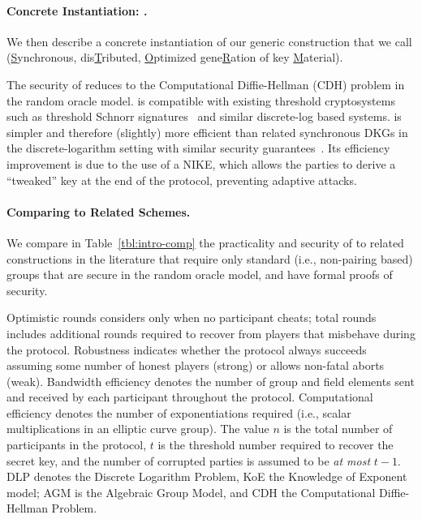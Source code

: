 \paragraph{Concrete Instantiation: \RG.}
We then describe a concrete instantiation of our generic construction that we call
\RG (\underline{S}ynchronous, dis\underline{T}ributed,
\underline{O}ptimized gene\underline{R}a\-tion of key \underline{M}aterial).

The security of \RG reduces to the Computational Diffie-Hellman (CDH) problem in the random oracle model.
\RG is compatible with existing threshold cryptosystems such
as threshold Schnorr signatures~\cite{KomloG20,Connolly22} and similar discrete-log based systems.
\RG is simpler and therefore (slightly) more efficient than related synchronous  DKGs in the discrete-logarithm setting with similar
security guarantees~\cite{GennaroJKR03}.
Its efficiency improvement is due to the use of a NIKE,
which allows the parties to derive
a ``tweaked'' key at the end of the protocol, preventing adaptive attacks.


\paragraph{Comparing \RG to Related Schemes.}
We compare in Table~\ref{tbl:intro-comp} the practicality and security of \RG to related constructions in the literature that require only standard (i.e., non-pairing based) groups
that are secure in the random oracle model,
and have formal proofs of security.

%
Optimistic rounds considers only when no participant cheats;
total rounds includes additional rounds required to recover from players that
misbehave during the protocol.
Robustness indicates whether the protocol always succeeds assuming some
number of honest players (strong) or allows non-fatal aborts (weak).
Bandwidth efficiency denotes the number of group and field elements sent and received by each participant throughout the protocol.
Computational efficiency denotes the number of exponentiations required (i.e., scalar multiplications in an elliptic curve group).
The value $n$ is the total number of participants in the protocol,
$t$ is the threshold number required to recover the secret key,
and the number of corrupted parties is assumed to be \emph{at most} $t-1$.
DLP denotes the Discrete Logarithm Problem,
KoE the Knowledge of Exponent model; AGM is the Algebraic Group Model,
and CDH the Computational Diffie-Hellman Problem.



